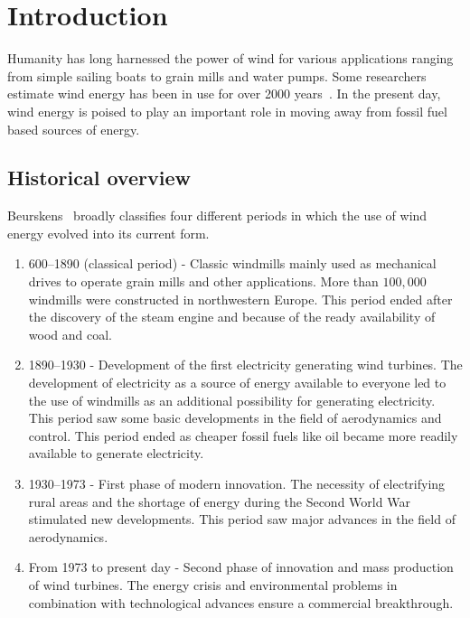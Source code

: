 \chapter{Introduction}
\label{ch:introduction}


Humanity has long harnessed the power of wind for various applications ranging from simple sailing boats to grain mills and water pumps. Some researchers estimate wind energy has been in use for over 2000 years~\cite{kaldellis2011wind}. In the present day, wind energy is poised to play an important role in moving away from fossil fuel based sources of energy.

\section{Historical overview}
Beurskens~\cite{beurskens2014history} broadly classifies four different periods in which the use of wind energy evolved into its current form. 
\begin{enumerate}
\item 600–1890 (classical period) - Classic windmills mainly used as mechanical drives to operate grain mills and other applications. More than $100,000$ windmills were constructed in northwestern Europe. This period ended after the discovery of the steam engine and because of the ready availability of wood and coal. 
\item 1890–1930 - Development of the first electricity generating wind turbines. The development of electricity as a source of energy available to everyone led to the use of windmills as an additional possibility for generating electricity. This period saw some basic developments in the field of aerodynamics and control. This period ended as cheaper fossil fuels like oil became more readily available to generate electricity.
\item 1930–1973 - First phase of modern innovation. The necessity of electrifying rural areas and the shortage of energy during the Second World War stimulated new developments. This period saw major advances in the field of aerodynamics. 
\item From 1973 to present day - Second phase of innovation and mass production of wind turbines. The energy crisis and environmental problems in combination with technological advances ensure a commercial breakthrough.
\end{enumerate}


